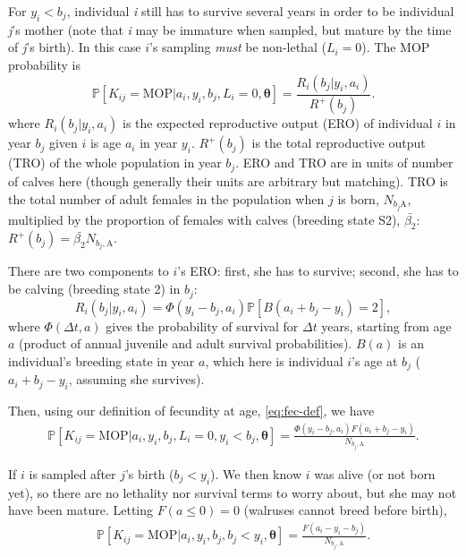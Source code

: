 For $y_{i}<b_{j}$, individual \emph{i} still has to survive several
years in order to be individual \emph{j}'s mother (note that \emph{i}
may be immature when sampled, but mature by the time of \emph{j}'s
birth). In this case $i$'s sampling \textit{must} be non-lethal ($L_{i}=0$).
The MOP probability is
\[
\mathbb{P}\left[K_{ij}=\text{MOP}\vert a_{i},y_{i},b_{j},L_{i}=0,\boldsymbol{\theta}\right]=\frac{R_{i}(b_{j}\vert y_{i},a_{i})}{R^{+}(b_{j})}.
\]
where $R_{i}(b_{j}\vert y_{i},a_{i})$ is the expected reproductive
output (ERO) of individual $i$ in year $b_{j}$ given $i$ is age
$a_{i}$ in year $y_{i}$. $R^{+}(b_{j})$ is the total reproductive
output (TRO) of the whole population in year $b_{j}$. ERO and TRO
are in units of \textquotedbl number of calves\textquotedbl{} here
(though generally their units are arbitrary but matching). TRO is
the total number of adult females in the population when $j$ is born,
$N_{b_{j}\text{A}}$, multiplied by the proportion of females with
calves (breeding state S2), $\bar{\beta_{2}}$: $R^{+}(b_{j})=\bar{\beta_{2}}N_{b_{j},\text{A}}$.

There are two components to $i$'s ERO: first, she has to survive;
second, she has to be calving (breeding state 2) in $b_{j}$:
\[
R_{i}\left(b_{j}\vert y_{i},a_{i}\right)=\Phi\left(y_{i}-b_{j},a_{i}\right)\mathbb{P}\left[B\left(a_{i}+b_{j}-y_{i}\right)=2\right],
\]
where $\Phi\left(\Delta t,a\right)$ gives the probability of survival
for $\Delta t$ years, starting from age $a$ (product of annual juvenile
and adult survival probabilities). $B\left(a\right)$ is an individual's
breeding state in year $a$, which here is individual \emph{$i$}'s
age at $b_{j}$ ($a_{i}+b_{j}-y_{i}$, assuming she survives).

Then, using our definition of fecundity at age, \eqref{eq:fec-def},
we have
\begin{gather}
\mathbb{P}\left[K_{ij}=\text{MOP}\vert a_{i},y_{i},b_{j},L_{i}=0,y_{i}<b_{j},\boldsymbol{\theta}\right]=\frac{\Phi\left(y_{i}-b_{j},a_{i}\right)F\left(a_{i}+b_{j}-y_{i}\right)}{N_{b_{j},\text{A}}}.\label{eq:MOP-future}
\end{gather}

If \emph{$i$} is sampled after $j$'s birth ($b_{j}<y_{i}$). We
then know \emph{$i$} was alive (or not born yet), so there are no
lethality nor survival terms to worry about, but she may not have
been mature. Letting $F\left(a\leqslant0\right)=0$ (walruses cannot
breed before birth),
\begin{gather}
\mathbb{P}\left[K_{ij}=\text{MOP}\vert a_{i},y_{i},b_{j},b_{j}<y_{i},\boldsymbol{\theta}\right]=\frac{F\left(a_{i}-y_{i}-b_{j}\right)}{N_{b_{j},\text{A}}}.\label{eq:MOP-past}
\end{gather}


